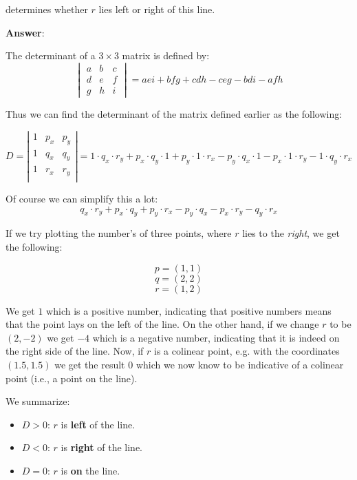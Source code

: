 determines whether $r$ lies left or right of this line.

\noindent
\textbf{Answer}:
\noindent

The determinant of a $3 \times 3$ matrix is defined by:
\begin{equation}
	\begin{vmatrix}
		a & b & c \\
		d & e & f \\
		g & h & i
	\end{vmatrix}
	= aei + bfg + cdh - ceg - bdi - afh
\end{equation}


Thus we can find the determinant of the matrix defined earlier as the following:

\begin{equation}
	D = \left| \begin{array}{ccc}
		1 & p_x & p_y \\
		1 & q_x & q_y \\
		1 & r_x & r_y \\
	\end{array} \right| = 1 \cdot q_{x} \cdot r_{y} + p_{x} \cdot q_{y} \cdot 1 + p_{y} \cdot 1 \cdot r_{x} - p_{y} \cdot q_{x} \cdot 1 - p_{x} \cdot 1 \cdot r_{y} - 1 \cdot q_{y} \cdot r_{x}
\end{equation}

Of course we can simplify this a lot:
\begin{equation}
	q_{x} \cdot r_{y} + p_{x} \cdot q_{y} + p_{y} \cdot r_{x} - p_{y} \cdot q_{x} - p_{x} \cdot r_{y} - q_{y} \cdot r_{x}
\end{equation}

If we try plotting the number's of three points, where $r$ lies to the \textit{right}, we get the following:

$$p = (1,1)$$
$$q = (2,2)$$
$$r = (1,2)$$

We get $1$ which is a positive number, indicating that positive numbers means that the point lays on the left of the line.
On the other hand, if we change $r$ to be $(2, -2)$ we get $-4$ which is a negative number, indicating that it is indeed on the right side of the line. Now, if $r$ is a colinear point, e.g. with the coordinates $(1.5, 1.5)$ we get the result $0$ which we now know to be indicative of a colinear point (i.e., a point on the line).

We summarize:
\begin{itemize}
	\item $D > 0$: $r$ is \textbf{left} of the line.
	\item $D < 0$: $r$ is \textbf{right} of the line.
	\item $D = 0$: $r$ is \textbf{on} the line.
\end{itemize}

